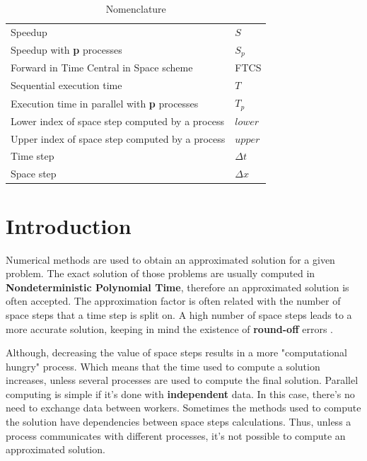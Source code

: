 \documentclass[12pt]{article}
\begin{document}

\begin{table}[tb]
\caption{Nomenclature}
\label{tab:notation}
\centering
\def\arraystretch{1.5}
\begin{tabular}{ll}
Speedup & $ S $ \\
Speedup with \textbf{p} processes & $ S_p $ \\
Forward in Time Central in Space scheme & FTCS \\
Sequential execution time & $T$ \\
Execution time in parallel with \textbf{p} processes & $T_p$ \\
Lower index of space step computed by a process & $lower$ \\
Upper index of space step computed by a process & $upper$ \\
Time step & $\Delta t$\\
Space step & $\Delta x$\\
\end{tabular}
\end{table}


\section*{Introduction}

Numerical methods are used to obtain an approximated solution for a given problem. The exact solution of those problems are usually computed in \textbf{Nondeterministic Polynomial Time}, therefore an approximated solution is often accepted. The approximation factor is often related with the number of space steps that a time step is split on. A high number of space steps leads to a more accurate solution, keeping in mind the existence of \textbf{round-off} errors \cite{fraga}.

\par Although, decreasing the value of space steps results in a more "computational hungry" process. Which means that the time used to compute a solution increases, unless several processes are used to compute the final solution. Parallel computing is simple if it's done with \textbf{independent} data. In this case, there's no need to exchange data between workers. Sometimes the methods used to compute the solution have dependencies between space steps calculations. Thus, unless a process communicates with different processes, it's not possible to compute an approximated solution. 
\end{document}

